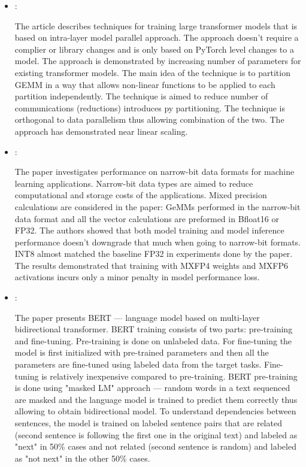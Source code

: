 \begin{itemize}
    \item \cite{Shoeybi:MegatronLM:2020}:

    The article describes techniques for training large transformer models that is based on intra-layer model parallel approach. The approach doesn't require a complier or library changes and is only based on PyTorch level changes to a model. The approach is demonstrated by increasing number of parameters for existing transformer models. The main idea of the technique is to partition GEMM in a way that allows non-linear functions to be applied to each partition independently. The technique is aimed to reduce number of communications (reductions) introduces py partitioning. The technique is orthogonal to data parallelism thus allowing combination of the two. The approach has demonstrated near linear scaling.

    \item \cite{Rouhani:Microscaling:2023}:

    The paper investigates performance on narrow-bit data formats for machine learning applications. Narrow-bit data types are aimed to reduce computational and storage costs of the applications. Mixed precision calculations are considered in the paper: GeMMs performed in the narrow-bit data format and all the vector calculations are preformed in Bfloat16 or FP32. The authors showed that both model training and model inference performance doesn't downgrade that much when going to narrow-bit formats. INT8 almost matched the baseline FP32 in experiments done by the paper. The results demonstrated that training with MXFP4 weights and MXFP6 activations incurs only a minor penalty in model performance loss.

    \item \cite{Devlin:Bert:2019}:

    The paper presents BERT --- language model based on multi-layer bidirectional transformer. BERT training consists of two parts: pre-training and fine-tuning. Pre-training is done on unlabeled data. For fine-tuning the model is first initialized with pre-trained parameters and then all the parameters are fine-tuned using labeled data from the target tasks. Fine-tuning is relatively inexpensive compared to pre-training. BERT pre-training is done using "masked LM" approach --- random words in a text sequenced are masked and the language model is trained to predict them correctly thus allowing to obtain bidirectional model. To understand dependencies between sentences, the model is trained on labeled sentence pairs that are related (second sentence is following the first one in the original text) and labeled as "next" in 50\% cases and not related (second sentence is random) and labeled as "not next" in the other 50\% cases.
\end{itemize}

